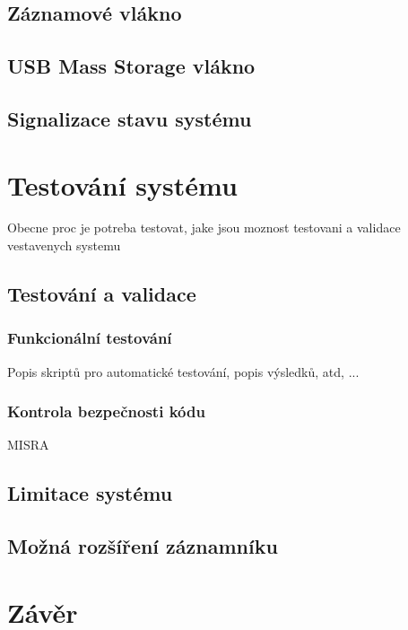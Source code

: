 \section{Záznamové vlákno}

\section{USB Mass Storage vlákno}

\section{Signalizace stavu systému}

\chapter{Testování systému}
Obecne proc je potreba testovat, jake jsou moznost testovani a validace vestavenych systemu


\section{Testování a validace}

\subsection{Funkcionální testování}
Popis skriptů pro automatické testování, popis výsledků, atd, ...

\subsection{Kontrola bezpečnosti kódu}
MISRA


\section{Limitace systému}
\label{limitace}


\section{Možná rozšíření záznamníku}
\label{mozne_rozsireni}

\chapter{Závěr}
\label{zaverPrace}



%
